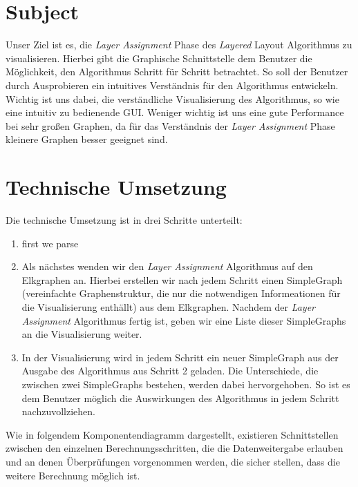\documentclass[12pt]{book}
\begin{document}
    
    \section*{Subject}
    
    Unser Ziel ist es, die  \textit{Layer Assignment} Phase des \textit{Layered} Layout Algorithmus zu visualisieren. 
    Hierbei gibt die Graphische Schnittstelle dem Benutzer die Möglichkeit, den Algorithmus Schritt für Schritt betrachtet. 
    So soll der Benutzer durch Ausprobieren ein intuitives Verständnis für den Algorithmus entwickeln. Wichtig ist uns
    dabei, die verständliche Visualisierung des Algorithmus, so wie eine intuitiv zu bedienende GUI. Weniger wichtig ist
    uns eine gute Performance bei sehr großen Graphen, da für das Verständnis der \textit{Layer Assignment} Phase kleinere Graphen besser geeignet sind.
    
    
    
    \section*{Technische Umsetzung}
    
    Die technische Umsetzung ist in drei Schritte unterteilt:
    
    \begin{enumerate}
        \item first we parse
        \item Als nächstes wenden wir den \textit{Layer Assignment} Algorithmus auf den Elkgraphen an. Hierbei erstellen wir nach
        jedem Schritt einen SimpleGraph (vereinfachte Graphenstruktur, die nur die notwendigen Informeationen für die
        Visualisierung enthällt) aus dem Elkgraphen. Nachdem der \textit{Layer Assignment} Algorithmus fertig ist, geben wir 
        eine Liste dieser SimpleGraphs an die Visualisierung weiter.
        \item In der Visualisierung wird in jedem Schritt ein neuer SimpleGraph aus der Ausgabe des Algorithmus aus Schritt 2 geladen. Die Unterschiede, die zwischen zwei SimpleGraphs bestehen, werden dabei hervorgehoben. So ist es dem Benutzer möglich die Auswirkungen des Algorithmus in jedem Schritt nachzuvollziehen.
    \end{enumerate}
    
    Wie in folgendem Komponentendiagramm dargestellt, existieren Schnittstellen zwischen den einzelnen Berechnungsschritten, die die Datenweitergabe erlauben und an denen Überprüfungen vorgenommen werden, die sicher stellen, dass die weitere Berechnung möglich ist.
    
\end{document}
